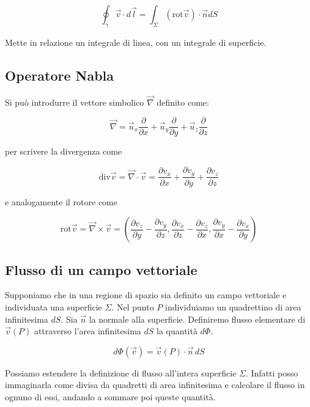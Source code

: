 \[
	\boxed{\oint_{\gamma} \vec{v} \cdot d\vec{l} = \int_{\Sigma}(\text{rot}\vec{v} )\cdot \vec{n} dS}
\]

Mette in relazione un integrale di linea, con un integrale di superficie.

\subsection{Operatore Nabla}

Si può introdurre il vettore simbolico $ \vec{\nabla}  $ definito come:

\[
	\vec{\nabla} = \vec{u}_x \frac{\partial}{\partial x} + \vec{u}_y \frac{\partial}{\partial y} + \vec{u}_z \frac{\partial}{\partial z}
\]

per scrivere la divergenza come

\[
	\text{div}\vec{v} = \vec{\nabla} \cdot \vec{v}  = \frac{\partial v_x}{\partial x} + \frac{\partial v_y}{\partial y} + \frac{\partial v_z}{\partial z}
\]

e analogamente il rotore come

\[
	\text{rot}\vec{v} = \vec{\nabla} \times  \vec{v}  = \left(
	\frac{\partial v_z}{\partial y} -\frac{\partial v_y}{\partial z},
	\frac{\partial v_x}{\partial z} -\frac{\partial v_z}{\partial x},
	\frac{\partial v_y}{\partial x} -\frac{\partial v_x}{\partial y} \right)
\]

\subsection{Flusso di un campo vettoriale}

Supponiamo che in una regione di spazio sia definito un campo vettoriale e individuata una superficie $\Sigma$. Nel punto $P$ individuiamo un quadrettino di area infinitesima $dS$. Sia $\vec{n}$ la normale alla superficie. Definiremo flusso elementare di $\vec{v}(P)$ attraverso l'area infinitesima $dS$ la quantità $d\Phi$.

\[
	\boxed{d\Phi (\vec{v}) = \vec{v} (P)\cdot \vec{n} \,dS}
\]

Possiamo estendere la definizione di flusso all'intera superficie $\Sigma$. Infatti posso immaginarla come divisa da quadretti di area infinitesima e calcolare il flusso in ognuno di essi, andando a sommare poi queste quantità.

